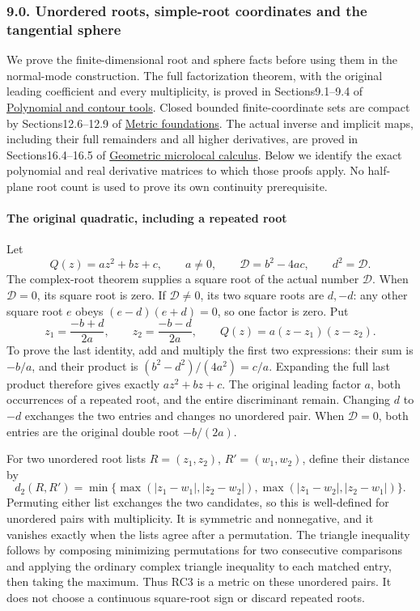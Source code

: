 \documentclass[
  11pt,
]{article}
\begin{document}
\subsubsection{9.0. Unordered roots, simple-root coordinates and the
tangential
sphere}\label{unordered-roots-simple-root-coordinates-and-the-tangential-sphere}

We prove the finite-dimensional root and sphere facts before using them
in the normal-mode construction. The full factorization theorem, with
the original leading coefficient and every multiplicity, is proved in
Sections9.1--9.4 of
\href{stable-prerequisite-bridges.pdf}{Polynomial and
contour tools}. Closed bounded finite-coordinate sets are compact by
Sections12.6--12.9 of \href{metric-foundation-bridges.pdf}{Metric
foundations}. The actual inverse and implicit maps, including their full
remainders and all higher derivatives, are proved in Sections16.4--16.5
of
\href{geometric-microlocal-calculus.pdf}{Geometric
microlocal calculus}. Below we identify the exact polynomial and real
derivative matrices to which those proofs apply. No half-plane root
count is used to prove its own continuity prerequisite.

\paragraph{The original quadratic, including a repeated
root}\label{the-original-quadratic-including-a-repeated-root}

Let \[
 Q(z)=az^2+bz+c,\qquad a\ne0,\qquad
 \mathcal D=b^2-4ac,\qquad d^2=\mathcal D.
 \tag{RC1}
\] The complex-root theorem supplies a square root of the actual number
\(\mathcal D\). When \(\mathcal D=0\), its square root is zero. If
\(\mathcal D\ne0\), its two square roots are \(d,-d\): any other square
root \(e\) obeys \((e-d)(e+d)=0\), so one factor is zero. Put \[
 z_1=\frac{-b+d}{2a},\qquad z_2=\frac{-b-d}{2a},\qquad
 Q(z)=a(z-z_1)(z-z_2).
 \tag{RC2}
\] To prove the last identity, add and multiply the first two
expressions: their sum is \(-b/a\), and their product is
\((b^2-d^2)/(4a^2)=c/a\). Expanding the full last product therefore
gives exactly \(az^2+bz+c\). The original leading factor \(a\), both
occurrences of a repeated root, and the entire discriminant remain.
Changing \(d\) to \(-d\) exchanges the two entries and changes no
unordered pair. When \(\mathcal D=0\), both entries are the original
double root \(-b/(2a)\).

For two unordered root lists \(R=(z_1,z_2)\), \(R'=(w_1,w_2)\), define
their distance by \[
 d_2(R,R')=
 \min\{\max(|z_1-w_1|,|z_2-w_2|),
          \max(|z_1-w_2|,|z_2-w_1|)\}.
 \tag{RC3}
\] Permuting either list exchanges the two candidates, so this is
well-defined for unordered pairs with multiplicity. It is symmetric and
nonnegative, and it vanishes exactly when the lists agree after a
permutation. The triangle inequality follows by composing minimizing
permutations for two consecutive comparisons and applying the ordinary
complex triangle inequality to each matched entry, then taking the
maximum. Thus RC3 is a metric on these unordered pairs. It does not
choose a continuous square-root sign or discard repeated roots.
\end{document}
